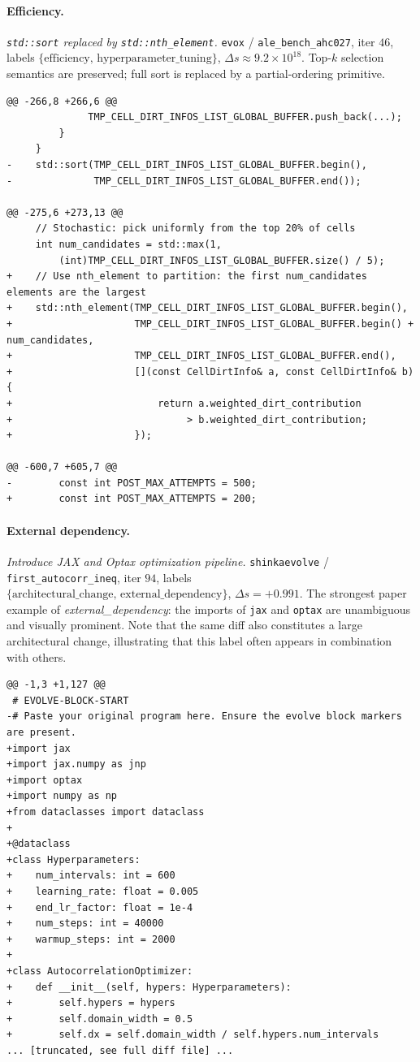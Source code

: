 \paragraph{Efficiency.}
\textit{\texttt{std::sort} replaced by \texttt{std::nth\_element}.} \texttt{evox} / \texttt{ale\_bench\_ahc027}, iter $46$, labels $\{\text{efficiency},\,\text{hyperparameter\_tuning}\}$, $\Delta s \approx 9.2 \times 10^{18}$. Top-$k$ selection semantics are preserved; full sort is replaced by a partial-ordering primitive.
{\scriptsize
\begin{verbatim}
@@ -266,8 +266,6 @@
              TMP_CELL_DIRT_INFOS_LIST_GLOBAL_BUFFER.push_back(...);
         }
     }
-    std::sort(TMP_CELL_DIRT_INFOS_LIST_GLOBAL_BUFFER.begin(),
-              TMP_CELL_DIRT_INFOS_LIST_GLOBAL_BUFFER.end());

@@ -275,6 +273,13 @@
     // Stochastic: pick uniformly from the top 20% of cells
     int num_candidates = std::max(1,
         (int)TMP_CELL_DIRT_INFOS_LIST_GLOBAL_BUFFER.size() / 5);
+    // Use nth_element to partition: the first num_candidates elements are the largest
+    std::nth_element(TMP_CELL_DIRT_INFOS_LIST_GLOBAL_BUFFER.begin(),
+                     TMP_CELL_DIRT_INFOS_LIST_GLOBAL_BUFFER.begin() + num_candidates,
+                     TMP_CELL_DIRT_INFOS_LIST_GLOBAL_BUFFER.end(),
+                     [](const CellDirtInfo& a, const CellDirtInfo& b) {
+                         return a.weighted_dirt_contribution
+                              > b.weighted_dirt_contribution;
+                     });

@@ -600,7 +605,7 @@
-        const int POST_MAX_ATTEMPTS = 500;
+        const int POST_MAX_ATTEMPTS = 200;
\end{verbatim}
}

\paragraph{External dependency.}
\textit{Introduce JAX and Optax optimization pipeline.} \texttt{shinkaevolve} / \texttt{first\_autocorr\_ineq}, iter $94$, labels $\{\text{architectural\_change},\,\text{external\_dependency}\}$, $\Delta s = +0.991$. The strongest paper example of \emph{external\_dependency}: the imports of \texttt{jax} and \texttt{optax} are unambiguous and visually prominent. Note that the same diff also constitutes a large architectural change, illustrating that this label often appears in combination with others.
{\scriptsize
\begin{verbatim}
@@ -1,3 +1,127 @@
 # EVOLVE-BLOCK-START
-# Paste your original program here. Ensure the evolve block markers are present.
+import jax
+import jax.numpy as jnp
+import optax
+import numpy as np
+from dataclasses import dataclass
+
+@dataclass
+class Hyperparameters:
+    num_intervals: int = 600
+    learning_rate: float = 0.005
+    end_lr_factor: float = 1e-4
+    num_steps: int = 40000
+    warmup_steps: int = 2000
+
+class AutocorrelationOptimizer:
+    def __init__(self, hypers: Hyperparameters):
+        self.hypers = hypers
+        self.domain_width = 0.5
+        self.dx = self.domain_width / self.hypers.num_intervals
... [truncated, see full diff file] ...
\end{verbatim}
}

